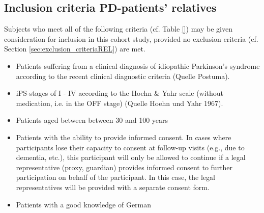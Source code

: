 \documentclass[
	a4paper, 
	11.5pt,
	headings=small, 
	twoside, 
	titlepage=firstiscover, 
 	pagesize=auto,
  	version=last,
	open=any,
	BCOR=14mm,
  	chapterprefix=false]{scrbook}
\begin{document}
\subsection{Inclusion criteria \ac{PD}-patients' relatives}
\label{sec:inclusion_criteriaREL}
Subjects who meet all of the following criteria (cf. Table \ref{}) may be given consideration for inclusion in this cohort study, provided no exclusion criteria (cf. Section \ref{sec:exclusion_criteriaREL}) are met.

\begin{itemize}
\item Patients suffering from a clinical diagnosis of idiopathic Parkinson's syndrome according to the recent clinical diagnostic criteria (Quelle Postuma).
\item \ac{iPS}-stages of I - IV according to the Hoehn \& Yahr scale (without medication, i.e. in the OFF stage) (Quelle Hoehn und Yahr 1967).
\item Patients aged between between 30 and 100 years
\item Patients with the ability to provide informed consent. In cases where participants lose their capacity to consent at follow-up visits (e.g., due to dementia, etc.), this participant will only be allowed to continue if a legal representative (proxy, guardian) provides informed consent to further participation on behalf of the participant. In this case, the legal representatives will be provided with a separate consent form.   
\item Patients with a good knowledge of German
\end{itemize}

\end{document}
